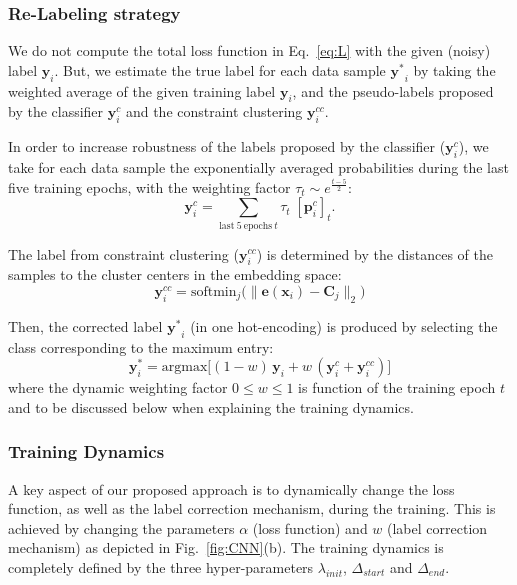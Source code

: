 \documentclass[runningheads, envcountsame, a4paper]{llncs}
\newcommand{\m}[1]{\ensuremath{\mathrm{#1}}}
\begin{document}
\subsubsection{Re-Labeling strategy} We do not compute the total loss function in Eq.~\eqref{eq:L} with the given (noisy) label $\bm y_i$. 
But, we estimate the true label for each data sample $\bm{y^*}_i$ by taking the weighted average of the given training label $\bm y_i$, and the pseudo-labels proposed by the classifier $\bm y^{c}_i$ and the constraint clustering $\bm y^{cc}_i$. 

In order to increase robustness of the labels proposed by the classifier ($\bm y^{c}_i$), we take for each data sample the exponentially averaged probabilities during the last five training epochs, with the weighting factor $\tau_t \sim e^{\frac{t-5}{2}}$:
\begin{equation}\label{eq:C}
    \bm y^{c}_{i}=  \sum_{\m{last\:5\:epochs\: } t} \tau_t \; [\bm p_i^c]_t.
\end{equation}

The label from constraint clustering ($\bm{y}^{cc}_{i}$) is determined by the distances of the samples to the cluster centers in the embedding space:
\begin{equation}
    \label{eq:CC}
    \bm y^{cc}_{i} = \text{softmin}_j \big(\| \bm e(\bm{x}_i) -\bm C_j \|_2\big)
\end{equation}


Then, the corrected label $\bm{y^*}_i$ (in one hot-encoding) is produced by selecting the class corresponding to the maximum entry:    
 \begin{equation}\label{eq:y*}
     \bm y^*_{i} = \text{argmax} \big[(1-w) \,\bm y_{i}+ w\,(\bm y^{c}_{i} +\bm y^{cc}_{i}) \big]
\end{equation}
where the dynamic weighting factor $0\leq w \leq 1$ is function of the training epoch $t$ and to be discussed below when explaining the training dynamics. 


\subsubsection{Training Dynamics} A key aspect of our proposed approach is to dynamically change the loss function, as well as the label correction mechanism, during the training. 
This is achieved by changing the parameters $\alpha$ (loss function) and $w$ (label correction mechanism) as depicted in Fig.~\ref{fig:CNN}(b). The training dynamics is completely defined by the three hyper-parameters $\lambda_{init}$, $\Delta_{start}$ and $\Delta_{end}$.
\end{document}
